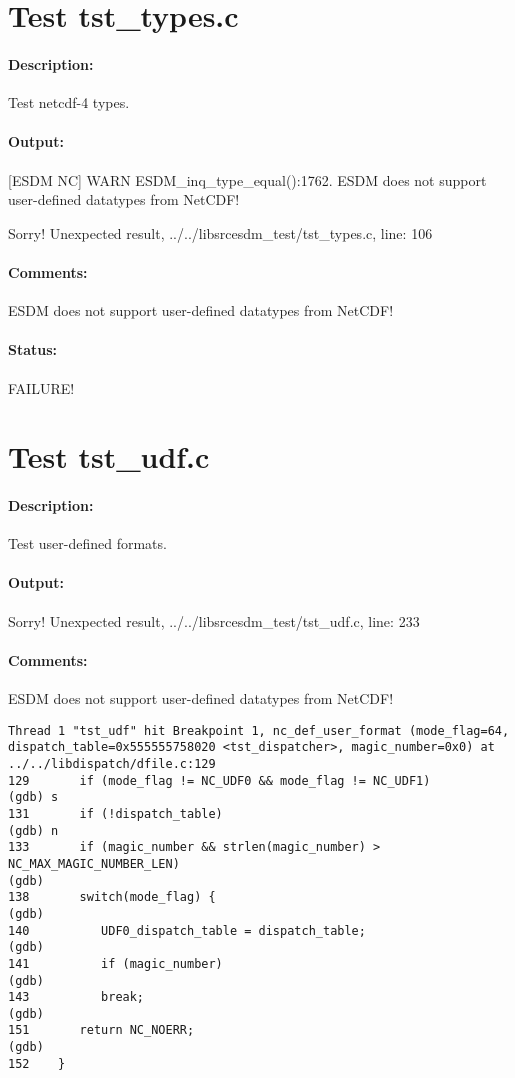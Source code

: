 \section{Test tst\_types.c}

\paragraph{Description:} Test netcdf-4 types.

\paragraph{Output:} [ESDM NC] WARN ESDM\_inq\_type\_equal():1762. ESDM does not support user-defined datatypes from NetCDF!

Sorry! Unexpected result, ../../libsrcesdm\_test/tst\_types.c, line: 106

\paragraph{Comments:} ESDM does not support user-defined datatypes from NetCDF!

\paragraph{Status:} FAILURE!

\section{Test tst\_udf.c}

\paragraph{Description:} Test user-defined formats.

\paragraph{Output:} Sorry! Unexpected result, ../../libsrcesdm\_test/tst\_udf.c, line: 233

\paragraph{Comments:} ESDM does not support user-defined datatypes from NetCDF!

\begin{verbatim}
Thread 1 "tst_udf" hit Breakpoint 1, nc_def_user_format (mode_flag=64, dispatch_table=0x555555758020 <tst_dispatcher>, magic_number=0x0) at ../../libdispatch/dfile.c:129
129       if (mode_flag != NC_UDF0 && mode_flag != NC_UDF1)
(gdb) s
131       if (!dispatch_table)
(gdb) n
133       if (magic_number && strlen(magic_number) > NC_MAX_MAGIC_NUMBER_LEN)
(gdb)
138       switch(mode_flag) {
(gdb)
140          UDF0_dispatch_table = dispatch_table;
(gdb)
141          if (magic_number)
(gdb)
143          break;
(gdb)
151       return NC_NOERR;
(gdb)
152    }
\end{verbatim}

